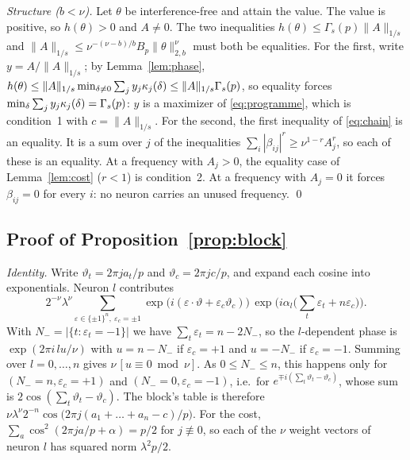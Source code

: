 \emph{Structure ($b<\nu$).} Let $\theta$ be interference-free and attain the value. The value is positive, so $h(\theta)>0$ and $A\neq0$. The two inequalities $h(\theta)\le\Gamma_s(p)\|A\|_{1/s}$ and $\|A\|_{1/s}\le\nu^{-(\nu-b)/b}B_p\|\theta\|_{2,b}^\nu$ must both be equalities. For the first, write $y=A/\|A\|_{1/s}$; by Lemma~\ref{lem:phase}, $h(\theta)\le\|A\|_{1/s}\min_{\delta\neq0}\sum_jy_j\kappa_{j}(\delta)\le\|A\|_{1/s}\Gamma_s(p)$, so equality forces $\min_\delta\sum_jy_j\kappa_{j}(\delta)=\Gamma_s(p)$: $y$ is a maximizer of \eqref{eq:programme}, which is condition~1 with $c=\|A\|_{1/s}$. For the second, the first inequality of \eqref{eq:chain} is an equality. It is a sum over $j$ of the inequalities $\sum_i|\beta_{ij}|^r\ge\nu^{1-r}A_j^r$, so each of these is an equality. At a frequency with $A_j>0$, the equality case of Lemma~\ref{lem:cost} ($r<1$) is condition~2. At a frequency with $A_j=0$ it forces $\beta_{ij}=0$ for every $i$: no neuron carries an unused frequency.
\qed

\subsection{Proof of Proposition~\ref{prop:block}}\label{app:block}

\emph{Identity.} Write $\vartheta_t=2\pi ja_t/p$ and $\vartheta_c=2\pi jc/p$, and expand each cosine into exponentials. Neuron $l$ contributes
\[
2^{-\nu}\lambda^\nu\sum_{\varepsilon\in\{\pm1\}^n,\ \varepsilon_c=\pm1}\exp\!\big(i(\varepsilon\cdot\vartheta+\varepsilon_c\vartheta_c)\big)\,\exp\!\Big(i\alpha_l\big(\textstyle\sum_t\varepsilon_t+n\varepsilon_c\big)\Big).
\]
With $N_-=|\{t:\varepsilon_t=-1\}|$ we have $\sum_t\varepsilon_t=n-2N_-$, so the $l$-dependent phase is $\exp(2\pi i\,lu/\nu)$ with $u=n-N_-$ if $\varepsilon_c=+1$ and $u=-N_-$ if $\varepsilon_c=-1$. Summing over $l=0,\dots,n$ gives $\nu\,[u\equiv0\bmod\nu]$. As $0\le N_-\le n$, this happens only for $(N_-=n,\varepsilon_c=+1)$ and $(N_-=0,\varepsilon_c=-1)$, i.e.\ for $e^{\mp i(\sum_t\vartheta_t-\vartheta_c)}$, whose sum is $2\cos(\sum_t\vartheta_t-\vartheta_c)$. The block's table is therefore $\nu\lambda^\nu2^{-n}\cos\big(2\pi j(a_1+\dots+a_n-c)/p\big)$. For the cost, $\sum_a\cos^2(2\pi ja/p+\alpha)=p/2$ for $j\not\equiv0$, so each of the $\nu$ weight vectors of neuron $l$ has squared norm $\lambda^2p/2$.


